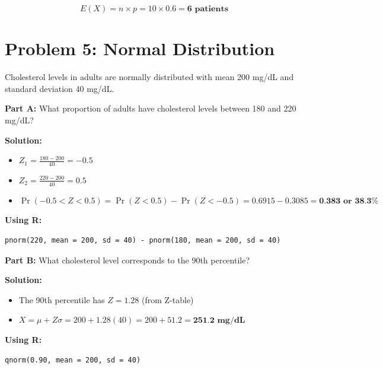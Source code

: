 \documentclass[11pt]{article}
\begin{document}
$$E(X) = n \times p = 10 \times 0.6 = \textbf{6 patients}$$

\section{Problem 5: Normal Distribution}

Cholesterol levels in adults are normally distributed with mean 200 mg/dL and standard deviation 40 mg/dL.

\vspace{12pt}

\textbf{Part A:} What proportion of adults have cholesterol levels between 180 and 220 mg/dL?

\textbf{Solution:}
\begin{itemize}
\item $Z_1 = \frac{180 - 200}{40} = -0.5$
\item $Z_2 = \frac{220 - 200}{40} = 0.5$
\item $\Pr(-0.5 < Z < 0.5) = \Pr(Z < 0.5) - \Pr(Z < -0.5) = 0.6915 - 0.3085 = \textbf{0.383 or 38.3\%}$
\end{itemize}

\textbf{Using R:}
\begin{verbatim}
pnorm(220, mean = 200, sd = 40) - pnorm(180, mean = 200, sd = 40)
\end{verbatim}

\vspace{12pt}

\textbf{Part B:} What cholesterol level corresponds to the 90th percentile?

\textbf{Solution:}
\begin{itemize}
\item The 90th percentile has $Z = 1.28$ (from Z-table)
\item $X = \mu + Z\sigma = 200 + 1.28(40) = 200 + 51.2 = \textbf{251.2 mg/dL}$
\end{itemize}

\textbf{Using R:}
\begin{verbatim}
qnorm(0.90, mean = 200, sd = 40)
\end{verbatim}
\end{document}

